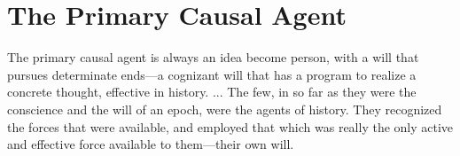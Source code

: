\section{The Primary Causal Agent}

\begin{quotex}
The primary causal agent is always an idea become person, with a will that pursues determinate ends---a cognizant will that has a program to realize a concrete thought, effective in history. ... The few, in so far as they were the conscience and the will of an epoch, were the agents of history. They recognized the forces that were available, and employed that which was really the only active and effective force available to them---their own will.
\end{quotex}




